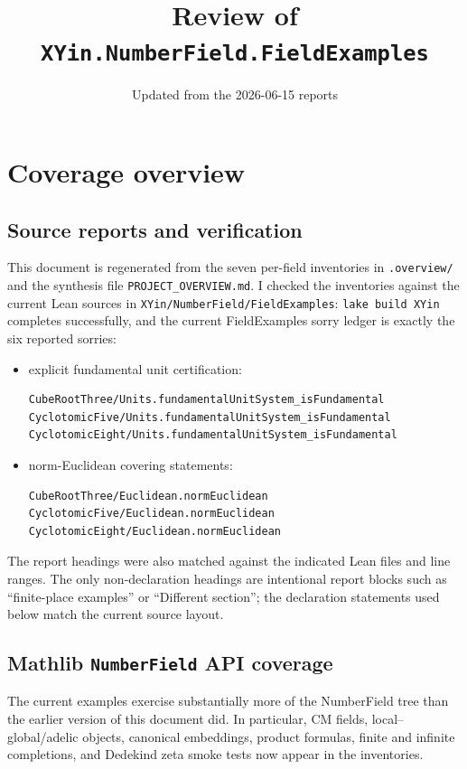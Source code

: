 \documentclass[UTF8,a4paper,11pt,fontset=fandol]{ctexart}
\title{Review of \texttt{XYin.NumberField.FieldExamples}}
\author{}
\date{Updated from the 2026-06-15 reports}
\theoremstyle{definition}
\begin{document}
\maketitle

\section{Coverage overview}

\subsection{Source reports and verification}

This document is regenerated from the seven per-field inventories in \texttt{.overview/}
and the synthesis file \texttt{PROJECT\_\allowbreak{}OVERVIEW.md}.  I checked the inventories against
the current Lean sources in \texttt{XYin/NumberField/FieldExamples}: \texttt{lake build XYin}
completes successfully, and the current FieldExamples sorry ledger is exactly the six
reported sorries:
\begin{itemize}
\item explicit fundamental unit certification:
\begin{verbatim}
CubeRootThree/Units.fundamentalUnitSystem_isFundamental
CyclotomicFive/Units.fundamentalUnitSystem_isFundamental
CyclotomicEight/Units.fundamentalUnitSystem_isFundamental
\end{verbatim}
\item norm-Euclidean covering statements:
\begin{verbatim}
CubeRootThree/Euclidean.normEuclidean
CyclotomicFive/Euclidean.normEuclidean
CyclotomicEight/Euclidean.normEuclidean
\end{verbatim}
\end{itemize}
The report headings were also matched against the indicated Lean files and line ranges.
The only non-declaration headings are intentional report blocks such as ``finite-place
examples'' or ``Different section''; the declaration statements used below match the
current source layout.

\subsection{Mathlib \texttt{NumberField} API coverage}

The current examples exercise substantially more of the NumberField tree than the earlier
version of this document did.  In particular, CM fields, local--global/adelic objects,
canonical embeddings, product formulas, finite and infinite completions, and Dedekind zeta
smoke tests now appear in the inventories.
\end{document}

